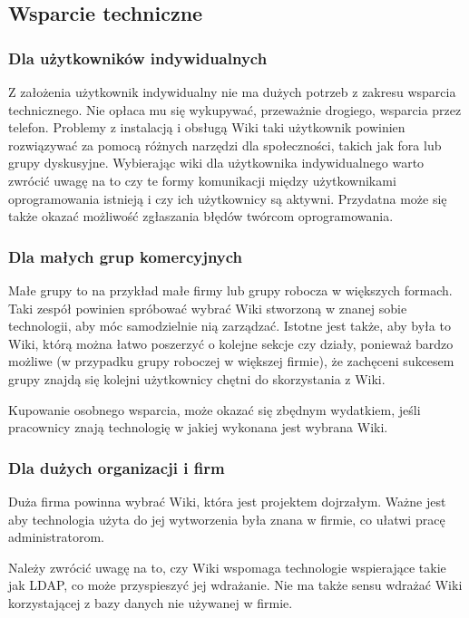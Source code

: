 \documentclass{article}
\begin{document}
	\subsection{Wsparcie techniczne}
		\subsubsection{Dla użytkowników indywidualnych}


			Z założenia użytkownik indywidualny nie ma dużych potrzeb z zakresu wsparcia technicznego. Nie opłaca mu się wykupywać, przeważnie drogiego, wsparcia przez telefon. Problemy z instalacją i obsługą Wiki taki użytkownik powinien rozwiązywać za pomocą różnych narzędzi dla społeczności, takich jak fora lub grupy dyskusyjne. Wybierając wiki dla użytkownika indywidualnego warto zwrócić uwagę na to czy te formy komunikacji między użytkownikami oprogramowania istnieją i czy ich użytkownicy są aktywni. Przydatna może się także okazać możliwość zgłaszania błędów twórcom oprogramowania.
		
		\subsubsection{Dla małych grup komercyjnych}


			Małe grupy to na przykład małe firmy lub grupy robocza w większych formach. Taki zespół powinien spróbować wybrać Wiki stworzoną w znanej sobie technologii, aby móc samodzielnie nią zarządzać. Istotne jest także, aby była to Wiki, którą można łatwo poszerzyć o kolejne sekcje czy działy, ponieważ bardzo możliwe (w przypadku grupy roboczej w większej firmie), że zachęceni sukcesem grupy znajdą się kolejni użytkownicy chętni do skorzystania z Wiki. 
	

	Kupowanie osobnego wsparcia, może okazać się zbędnym wydatkiem, jeśli pracownicy znają technologię w jakiej wykonana jest wybrana Wiki.
		
		\subsubsection{Dla dużych organizacji i firm}
		

		Duża firma powinna wybrać Wiki, która jest projektem dojrzałym. Ważne jest aby technologia użyta do jej wytworzenia była znana w firmie, co ułatwi pracę administratorom.

	Należy zwrócić uwagę na to, czy Wiki wspomaga technologie wspierające takie jak LDAP, co może przyspieszyć jej wdrażanie. Nie ma także sensu wdrażać Wiki korzystającej z bazy danych nie używanej w firmie. 
\end{document}
